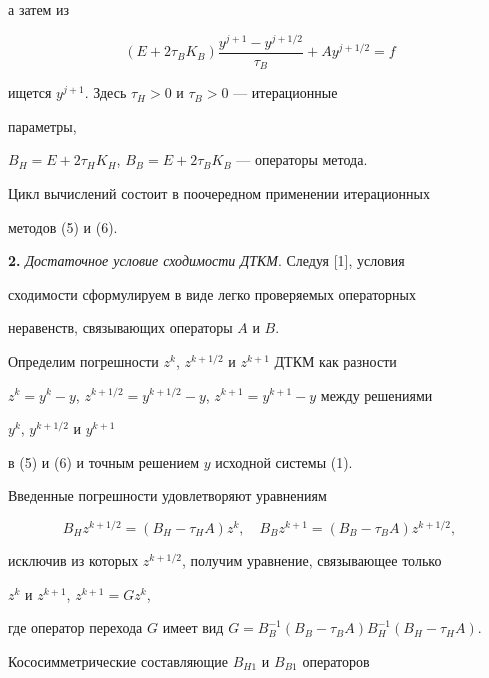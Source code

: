 а затем из 


\begin{equation} 


(E+2\tau_B K_B)\frac{y^{j+1}-y^{j+1/2}}{\tau_B}+ 


A y^{j+1/2}=f 


\end{equation} 


ищется $y^{j+1}$. Здесь $\tau_H>0$ и $\tau_B>0$ --- итерационные 


параметры, 


$B_H=E+2\tau_H K_H$, $B_B=E+2\tau_B K_B$ --- операторы метода. 


Цикл вычислений состоит в поочередном применении итерационных  


методов (5) и (6). 


\medskip 


 


{\bf 2.} {\it Достаточное условие сходимости ДТКМ}. Следуя [1], условия 


сходимости сформулируем в виде легко проверяемых операторных  


неравенств, связывающих операторы $A$ и $B$.  


 


Определим погрешности $z^k$, $z^{k+1/2}$ и $z^{k+1}$ ДТКМ как разности  


$z^k=y^k-y$, $z^{k+1/2}=y^{k+1/2}-y$, $z^{k+1}=y^{k+1}-y$ между решениями 


$y^k$, $y^{k+1/2}$ и $y^{k+1}$ 


в (5) и (6) и точным решением $y$ исходной системы (1). 


Введенные погрешности удовлетворяют уравнениям  


$$ 


B_H z^{k+1/2}=(B_H-\tau_H A)z^k,\quad 


B_B z^{k+1}=(B_B-\tau_B A)z^{k+1/2}, 


$$ 


исключив из которых $z^{k+1/2}$, получим уравнение, связывающее только 


$z^k$ и $z^{k+1}$, $z^{k+1}=G z^k$, 


где оператор перехода $G$ имеет вид $G=B^{-1}_B(B_B-\tau_B 


A)B^{-1}_H(B_H-\tau_H A)$. 


 


Кососимметрические составляющие $B_{H1}$ и $B_{B1}$ операторов  


